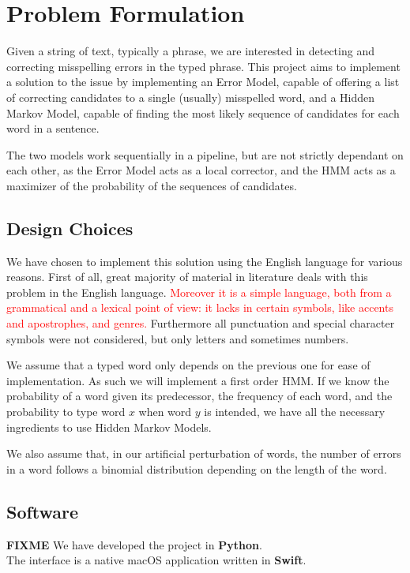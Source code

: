 \chapter{Problem Formulation}

Given a string of text, typically a phrase, we are interested in detecting and correcting misspelling errors in the typed phrase.
This project aims to implement a solution to the issue by implementing an Error Model, capable of offering a list 
of correcting candidates to a single (usually) misspelled word, and a Hidden Markov Model, capable of finding 
the most likely sequence of candidates for each word in a sentence.

The two models work sequentially in a pipeline, but are not strictly dependant on each other, as the Error Model 
acts as a local corrector, and the HMM acts as a maximizer of the probability of the sequences of candidates.

\section{Design Choices}

We have chosen to implement this solution using the English language for various reasons. First of all, great majority of material in literature 
deals with this problem in the English language. \textcolor{red}{Moreover it is a simple language, both from a 
	grammatical and a lexical point of view: it lacks in certain symbols, like accents and apostrophes, and genres. }
Furthermore all punctuation and special character symbols were not considered, but only letters and sometimes 
numbers. 

We assume that a typed word only depends on the previous one for ease of implementation. As such we will implement a first order HMM. 
If we know the probability of a word given its predecessor, the frequency of each word, and the probability to 
type word $x$ when word $y$ is intended, we have all the necessary ingredients to use Hidden Markov Models.

We also assume that, in our artificial perturbation of words, the number of errors in a word follows a binomial 
distribution depending on the length of the word.

\section{Software}
\textbf{FIXME}
We have developed the project in \textbf{Python}.\\
The interface is a native macOS application written in \textbf{Swift}.